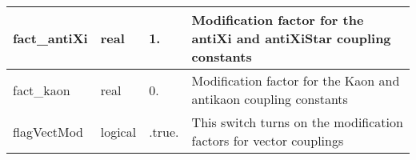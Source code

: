 \documentclass{article}
\begin{document}
\begin{longtable}{llll}
\midrule
fact\_antiXi & \begin{minipage}[t]{2cm}real\end{minipage} & \begin{minipage}[t]{2cm}1.\end{minipage} & \begin{minipage}[t]{12cm}Modification factor for the antiXi and antiXiStar coupling constants\end{minipage}\\*
\midrule
fact\_kaon & \begin{minipage}[t]{2cm}real\end{minipage} & \begin{minipage}[t]{2cm}0.\end{minipage} & \begin{minipage}[t]{12cm}Modification factor for the Kaon and antikaon coupling constants\end{minipage}\\*
\midrule
flagVectMod & \begin{minipage}[t]{2cm}logical\end{minipage} & \begin{minipage}[t]{2cm}.true.\end{minipage} & \begin{minipage}[t]{12cm}This switch turns on the modification factors for vector couplings\end{minipage}\\*
\bottomrule
\end{longtable}
{ }



\end{document}
